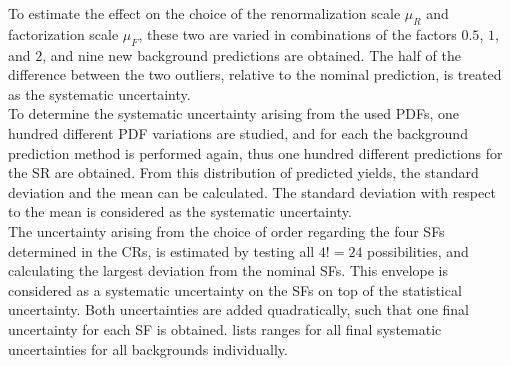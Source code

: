 To estimate the effect on the choice of the renormalization scale $\mu_R$ and factorization scale $\mu_F$, these two are varied in combinations of the factors $0.5$, $1$, and $2$, and nine new background predictions are obtained. The half of the difference between the two outliers, relative to the nominal prediction, is treated as the systematic uncertainty.\\
To determine the systematic uncertainty arising from the used PDFs, one hundred different PDF variations are studied, and for each the background prediction method is performed again, thus one hundred different predictions for the SR are obtained. From this distribution of predicted yields, the standard deviation and the mean can be calculated. The standard deviation with respect to the mean is considered as the systematic uncertainty.\\
The uncertainty arising from the choice of order regarding the four SFs determined in the CRs, is estimated by testing all $4!=24$ possibilities, and calculating the largest deviation from the nominal SFs. This envelope is considered as a systematic uncertainty on the SFs on top of the statistical uncertainty. Both uncertainties are added quadratically, such that one final uncertainty for each SF is obtained.
 lists ranges for all final systematic uncertainties for all backgrounds individually.

